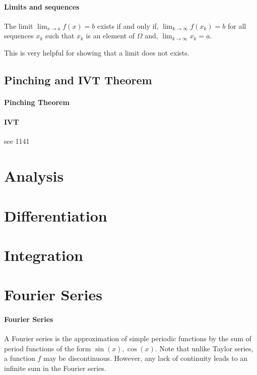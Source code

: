 \documentclass[12pt, letterpaper]{article}
\begin{document}
    \paragraph{Limits and sequences}
    The limit \(\lim_{x\to a} f(x) = b\) exists if and only if,
    \(\lim_{k\to\infty} f(x_k) = b\)  for all sequences \({x_k}\) such that 
    \(x_k\) is an element of \(\Omega\) and,
    \(\lim_{k\to\infty} x_k = a\).
    
    This is very helpful for showing that a limit does not exists.

    \subsection{Pinching and IVT Theorem}
    \paragraph{Pinching Theorem}
    \paragraph{IVT}
    see 1141
    
    
    \section{Analysis}
    \section{Differentiation}
    \section{Integration}
    


    \section{Fourier Series}
    \paragraph{Fourier Series}
    A Fourier series is the approximation of simple periodic functions by
    the sum of period functions of the form \(\sin(x), \cos(x)\).
    Note that unlike Taylor series, a function \(f\) may be discontinuous.
    However, any lack of continuity leads to an infinite sum in the Fourier series.
    
\end{document}
